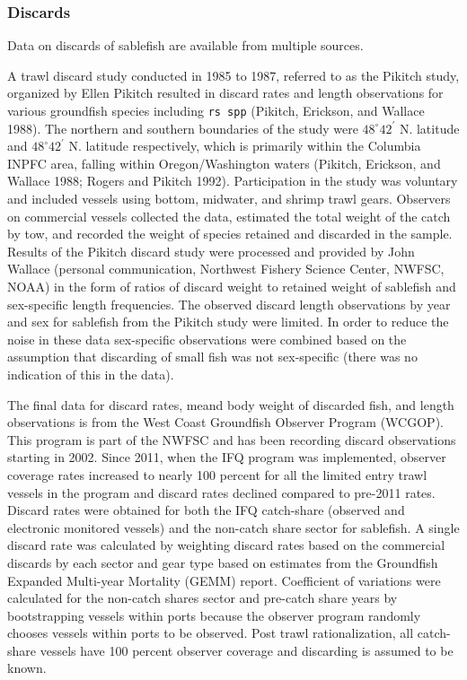 \documentclass[
]{scrartcl}
\begin{document}
\subsubsection{Discards}\label{discards}

Data on discards of sablefish are available from multiple sources.

A trawl discard study conducted in 1985 to 1987, referred to as the
Pikitch study, organized by Ellen Pikitch resulted in discard rates and
length observations for various groundfish species including
\texttt{rs\ spp} (Pikitch, Erickson, and Wallace 1988). The northern and
southern boundaries of the study were \(48^\circ 42^\prime\) N. latitude
and \(48^\circ 42^\prime\) N. latitude respectively, which is primarily
within the Columbia INPFC area, falling within Oregon/Washington waters
(Pikitch, Erickson, and Wallace 1988; Rogers and Pikitch 1992).
Participation in the study was voluntary and included vessels using
bottom, midwater, and shrimp trawl gears. Observers on commercial
vessels collected the data, estimated the total weight of the catch by
tow, and recorded the weight of species retained and discarded in the
sample. Results of the Pikitch discard study were processed and provided
by John Wallace (personal communication, Northwest Fishery Science
Center, NWFSC, NOAA) in the form of ratios of discard weight to retained
weight of sablefish and sex-specific length frequencies. The observed
discard length observations by year and sex for sablefish from the
Pikitch study were limited. In order to reduce the noise in these data
sex-specific observations were combined based on the assumption that
discarding of small fish was not sex-specific (there was no indication
of this in the data).

The final data for discard rates, meand body weight of discarded fish,
and length observations is from the West Coast Groundfish Observer
Program (WCGOP). This program is part of the NWFSC and has been
recording discard observations starting in 2002. Since 2011, when the
IFQ program was implemented, observer coverage rates increased to nearly
100 percent for all the limited entry trawl vessels in the program and
discard rates declined compared to pre-2011 rates. Discard rates were
obtained for both the IFQ catch-share (observed and electronic monitored
vessels) and the non-catch share sector for sablefish. A single discard
rate was calculated by weighting discard rates based on the commercial
discards by each sector and gear type based on estimates from the
Groundfish Expanded Multi-year Mortality (GEMM) report. Coefficient of
variations were calculated for the non-catch shares sector and pre-catch
share years by bootstrapping vessels within ports because the observer
program randomly chooses vessels within ports to be observed. Post trawl
rationalization, all catch-share vessels have 100 percent observer
coverage and discarding is assumed to be known.
\end{document}
